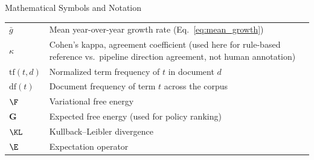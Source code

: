 \documentclass[
  ignorenonframetext,
]{beamer}
\begin{document}
\begin{frame}[allowframebreaks]{Mathematical Symbols and Notation}
\begin{table}[H]
\begin{tabular}{ll}
$\bar{g}$ & Mean year-over-year growth rate (Eq.~\ref{eq:mean_growth}) \\
$\kappa$ & Cohen's kappa, agreement coefficient (used here for rule-based reference vs.\ pipeline direction agreement, not human annotation) \\
$\text{tf}(t,d)$ & Normalized term frequency of $t$ in document $d$ \\
$\text{df}(t)$ & Document frequency of term $t$ across the corpus \\
$\F$ & Variational free energy \\
$\mathbf{G}$ & Expected free energy (used for policy ranking) \\
$\KL$ & Kullback--Leibler divergence \\
$\E$ & Expectation operator \\
\bottomrule
\end{tabular}
\end{table}
\end{frame}
\end{document}
